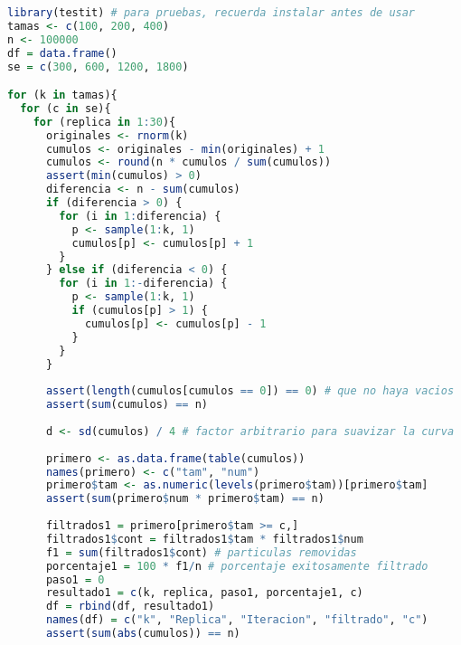 \documentclass{article}
\begin{document}

\lstset{style=mystyle}
\begin{lstlisting}[language=R, caption= Código para graficar el porcentaje de filtrado en cada iteración.]
library(testit) # para pruebas, recuerda instalar antes de usar
tamas <- c(100, 200, 400)
n <- 100000
df = data.frame()
se = c(300, 600, 1200, 1800)

for (k in tamas){
  for (c in se){
    for (replica in 1:30){
      originales <- rnorm(k)
      cumulos <- originales - min(originales) + 1
      cumulos <- round(n * cumulos / sum(cumulos))
      assert(min(cumulos) > 0)
      diferencia <- n - sum(cumulos)
      if (diferencia > 0) {
        for (i in 1:diferencia) {
          p <- sample(1:k, 1)
          cumulos[p] <- cumulos[p] + 1
        }
      } else if (diferencia < 0) {
        for (i in 1:-diferencia) {
          p <- sample(1:k, 1)
          if (cumulos[p] > 1) {
            cumulos[p] <- cumulos[p] - 1
          }
        }
      }
      
      assert(length(cumulos[cumulos == 0]) == 0) # que no haya vacios
      assert(sum(cumulos) == n)
      
      d <- sd(cumulos) / 4 # factor arbitrario para suavizar la curva
      
      primero <- as.data.frame(table(cumulos))
      names(primero) <- c("tam", "num")
      primero$tam <- as.numeric(levels(primero$tam))[primero$tam]
      assert(sum(primero$num * primero$tam) == n)
      
      filtrados1 = primero[primero$tam >= c,]
      filtrados1$cont = filtrados1$tam * filtrados1$num
      f1 = sum(filtrados1$cont) # particulas removidas
      porcentaje1 = 100 * f1/n # porcentaje exitosamente filtrado
      paso1 = 0
      resultado1 = c(k, replica, paso1, porcentaje1, c)
      df = rbind(df, resultado1)
      names(df) = c("k", "Replica", "Iteracion", "filtrado", "c")
      assert(sum(abs(cumulos)) == n)
      

\end{lstlisting}
\end{document}
